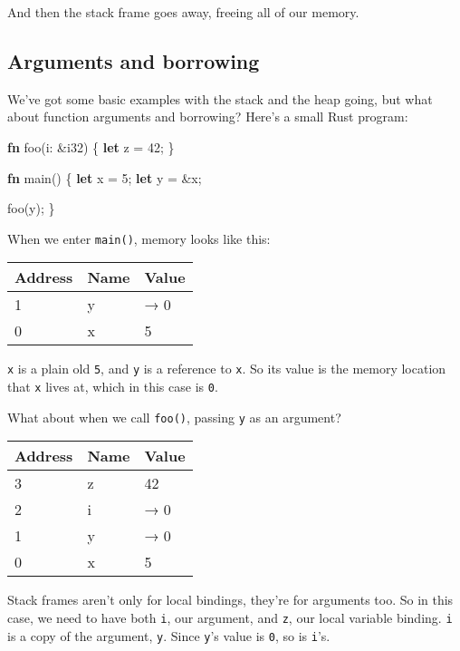 \documentclass[a4paper,]{book}
\newenvironment{Shaded}{\begin{snugshade}}{\end{snugshade}}
\newcommand{\KeywordTok}[1]{\textcolor[rgb]{0.13,0.29,0.53}{\textbf{{#1}}}}
\newcommand{\DataTypeTok}[1]{\textcolor[rgb]{0.13,0.29,0.53}{{#1}}}
\newcommand{\DecValTok}[1]{\textcolor[rgb]{0.00,0.00,0.81}{{#1}}}
\newcommand{\NormalTok}[1]{{#1}}
\begin{document}
And then the stack frame goes away, freeing all of our memory.

\subsection{Arguments and borrowing}\label{arguments-and-borrowing}

We've got some basic examples with the stack and the heap going, but
what about function arguments and borrowing? Here's a small Rust
program:

\begin{Shaded}
\begin{Highlighting}[]
\KeywordTok{fn} \NormalTok{foo(i: &}\DataTypeTok{i32}\NormalTok{) \{}
    \KeywordTok{let} \NormalTok{z = }\DecValTok{42}\NormalTok{;}
\NormalTok{\}}

\KeywordTok{fn} \NormalTok{main() \{}
    \KeywordTok{let} \NormalTok{x = }\DecValTok{5}\NormalTok{;}
    \KeywordTok{let} \NormalTok{y = &x;}

    \NormalTok{foo(y);}
\NormalTok{\}}
\end{Highlighting}
\end{Shaded}

When we enter \texttt{main()}, memory looks like this:

\begin{longtable}[]{@{}lll@{}}
\toprule
Address & Name & Value\tabularnewline
\midrule
\endhead
1 & y & → 0\tabularnewline
0 & x & 5\tabularnewline
\bottomrule
\end{longtable}

\texttt{x} is a plain old \texttt{5}, and \texttt{y} is a reference to
\texttt{x}. So its value is the memory location that \texttt{x} lives
at, which in this case is \texttt{0}.

What about when we call \texttt{foo()}, passing \texttt{y} as an
argument?

\begin{longtable}[]{@{}lll@{}}
\toprule
Address & Name & Value\tabularnewline
\midrule
\endhead
3 & z & 42\tabularnewline
2 & i & → 0\tabularnewline
1 & y & → 0\tabularnewline
0 & x & 5\tabularnewline
\bottomrule
\end{longtable}

Stack frames aren't only for local bindings, they're for arguments too.
So in this case, we need to have both \texttt{i}, our argument, and
\texttt{z}, our local variable binding. \texttt{i} is a copy of the
argument, \texttt{y}. Since \texttt{y}'s value is \texttt{0}, so is
\texttt{i}'s.
\end{document}
